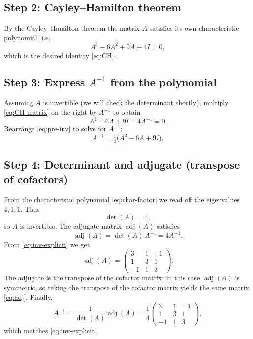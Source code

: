 \documentclass[journal]{IEEEtran}
\begin{document}
\subsection*{Step 2: Cayley--Hamilton theorem}
By the Cayley--Hamilton theorem the matrix \(A\) satisfies its own characteristic polynomial, i.e.
\begin{equation}\label{eq:CH-matrix}
A^{3}-6A^{2}+9A-4I=0,
\end{equation}
which is the desired identity \eqref{eq:CH}.

\subsection*{Step 3: Express \(A^{-1}\) from the polynomial}
Assuming \(A\) is invertible (we will check the determinant shortly), multiply \eqref{eq:CH-matrix} on the right by \(A^{-1}\) to obtain
\begin{equation}\label{eq:pre-inv}
A^{2}-6A+9I-4A^{-1}=0.
\end{equation}
Rearrange \eqref{eq:pre-inv} to solve for \(A^{-1}\):
\begin{equation}\label{eq:inv-formula}
A^{-1}=\tfrac{1}{4}\bigl(A^{2}-6A+9I\bigr).
\end{equation}



\subsection*{Step 4: Determinant and adjugate (transpose of cofactors)}
From the characteristic polynomial \eqref{eq:char-factor} we read off the eigenvalues \(4,1,1\). Thus
\begin{equation}\label{eq:det}
\det(A)=4,
\end{equation}
so \(A\) is invertible. The adjugate matrix \(\operatorname{adj}(A)\) satisfies
\[
\operatorname{adj}(A)=\det(A)\,A^{-1}=4A^{-1}.
\]
From \eqref{eq:inv-explicit} we get
\begin{equation}\label{eq:adj}
\operatorname{adj}(A)=
\begin{pmatrix}
3 & 1 & -1\\[4pt]
1 & 3 & 1\\[4pt]
-1 & 1 & 3
\end{pmatrix}.
\end{equation}
The adjugate is the transpose of the cofactor matrix; in this case \(\operatorname{adj}(A)\) is symmetric, so taking the transpose of the cofactor matrix yields the same matrix \eqref{eq:adj}. Finally,
\begin{equation}\label{eq:inv-final}
A^{-1}=\frac{1}{\det(A)}\operatorname{adj}(A)=\frac{1}{4}
\begin{pmatrix}
3 & 1 & -1\\[4pt]
1 & 3 & 1\\[4pt]
-1 & 1 & 3
\end{pmatrix},
\end{equation}
which matches \eqref{eq:inv-explicit}.
\end{document}
